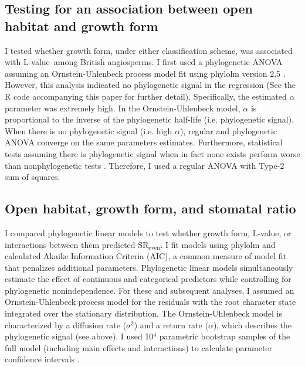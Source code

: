 \documentclass[12pt, oneside]{article}
\newcommand{\pkg}[1]{{\fontseries{b}\selectfont #1}}
\newcommand{\el}{L-value}
\begin{document}
\subsection*{Testing for an association between open habitat and growth form}

I tested whether growth form, under either classification scheme, was associated with \el~among British angiosperms. I first used a phylogenetic ANOVA assuming an Ornstein-Uhlenbeck process model fit using \pkg{phylolm} version 2.5 \citep{Ho_Ane_2014}. However, this analysis indicated no phylogenetic signal in the regression (See the R code accompanying this paper for further detail). Specifically, the estimated $\alpha$ parameter was extremely high. In the Ornstein-Uhlenbeck model, $\alpha$ is proportional to the inverse of the phylogenetic half-life (i.e. phylogenetic signal). When there is no phylogenetic signal (i.e. high $\alpha$), regular and phylogenetic ANOVA converge on the same parameters estimates. Furthermore, statistical tests assuming there is phylogenetic signal when in fact none exists perform worse than nonphylogenetic tests \citep{Revell_2010}. Therefore, I used a regular ANOVA with Type-2 sum of squares. 

\subsection*{Open habitat, growth form, and stomatal ratio}


I compared phylogenetic linear models to test whether growth form, \el, or interactions between them predicted $\textrm{SR}_\textrm{even}$. I fit models using \pkg{phylolm} and calculated Akaike Information Criteria (AIC), a common measure of model fit that penalizes additional parameters. Phylogenetic linear models simultaneously estimate the effect of continuous and categorical predictors while controlling for phylogenetic nonindependence. For these and subsequent analyses, I assumed an Ornstein-Uhlenbeck process model for the residuals with the root character state integrated over the stationary distribution. The Ornstein-Uhlenbeck model is characterized by a diffusion rate ($\sigma ^ 2$) and a return rate ($\alpha$), which describes the phylogenetic signal (see above). I used 10$^4$ parametric bootstrap samples of the full model (including main effects and interactions) to calculate parameter confidence intervals \citep{Boettiger_etal_2012}. 
\end{document}
